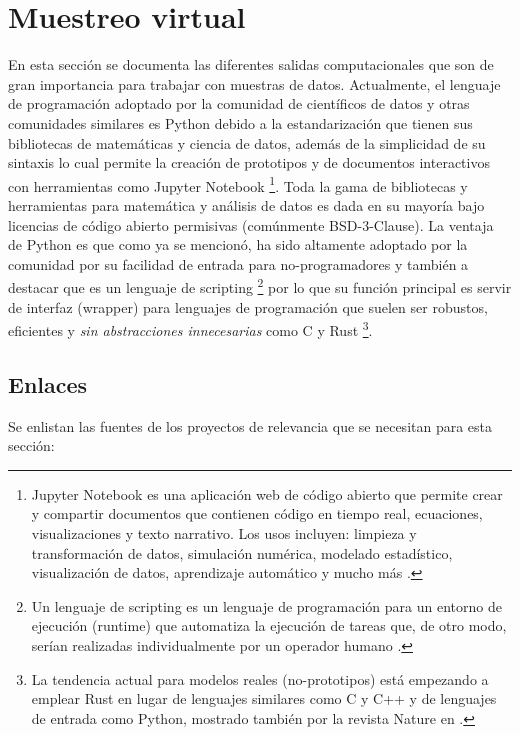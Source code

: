 \documentclass{report}
\begin{document}
\section{Muestreo virtual}

En esta sección se documenta las diferentes salidas computacionales que son de gran importancia para trabajar con muestras de datos. Actualmente, el lenguaje de programación adoptado por la comunidad de científicos de datos y otras comunidades similares es Python debido a la estandarización que tienen sus bibliotecas de matemáticas y ciencia de datos, además de la simplicidad de su sintaxis lo cual permite la creación de prototipos y de documentos interactivos con herramientas como Jupyter Notebook \footnote{Jupyter Notebook es una aplicación web de código abierto que permite crear y compartir documentos que contienen código en tiempo real, ecuaciones, visualizaciones y texto narrativo. Los usos incluyen: limpieza y transformación de datos, simulación numérica, modelado estadístico, visualización de datos, aprendizaje automático y mucho más \cite{jupyter-2021}.}. Toda la gama de bibliotecas y herramientas para matemática y análisis de datos es dada en su mayoría bajo licencias de código abierto permisivas (comúnmente BSD-3-Clause). La ventaja de Python es que como ya se mencionó, ha sido altamente adoptado por la comunidad por su facilidad de entrada para no-programadores y también a destacar que es un lenguaje de scripting \footnote{Un lenguaje de scripting es un lenguaje de programación para un entorno de ejecución (runtime) que automatiza la ejecución de tareas que, de otro modo, serían realizadas individualmente por un operador humano \cite{wikipedia-scripting-2021B}.} por lo que su función principal es servir de interfaz (wrapper) para lenguajes de programación que suelen ser robustos, eficientes y \textit{sin abstracciones innecesarias} como C y Rust \footnote{La tendencia actual para modelos reales (no-prototipos) está empezando a emplear Rust en lugar de lenguajes similares como C y C++ y de lenguajes de entrada como Python, mostrado también por la revista Nature en  \cite{nature-editorial-2020}.}.

\subsection{Enlaces}

Se enlistan las fuentes de los proyectos de relevancia que se necesitan para esta sección:
\end{document}
